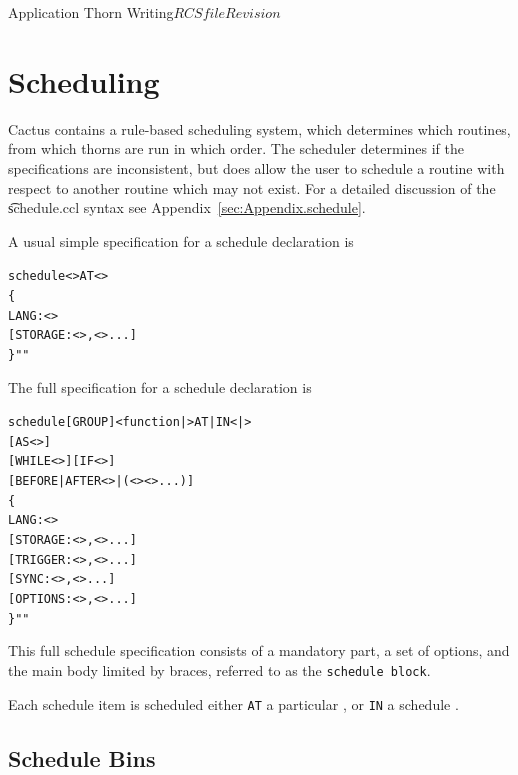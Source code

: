 \begin{cactuspart}{Application Thorn Writing}{$RCSfile$}{$Revision$}

\chapter{Scheduling}
\label{chap:scheduling}

Cactus contains a rule-based scheduling system, which determines which
routines, from which thorns are run in which order.  The scheduler
determines if the specifications are inconsistent, but does allow the
user to schedule a routine with respect to another routine which may not
exist.
For a detailed discussion of the {\t schedule.ccl} syntax see
Appendix~\ref{sec:Appendix.schedule}.

A usual simple specification for a schedule declaration is
\begin{alltt}schedule <> AT <>
\{
  LANG: <>
  [STORAGE:       <>,<>...]
\} ""
\end{alltt}

The full specification for a schedule declaration is
\begin{alltt}schedule [GROUP] <function|> AT|IN <|>
         [AS <>]
         [WHILE <>] [IF <>]
         [BEFORE|AFTER <>|(<> <> ...)]
\{
  LANG: <>
  [STORAGE:       <>,<>...]
  [TRIGGER:       <>,<>...]
  [SYNC:          <>,<>...]
  [OPTIONS:       <>,<>...]
\} ""
\end{alltt}

This full schedule specification consists of a mandatory part, a set
of options, and the main body limited by braces, referred to as the
\texttt{schedule block}.

Each schedule item is scheduled either \texttt{AT} a particular
, or \texttt{IN} a schedule .


\section{Schedule Bins}
\label{scheduling:schedule_bins}


\end{cactuspart}
